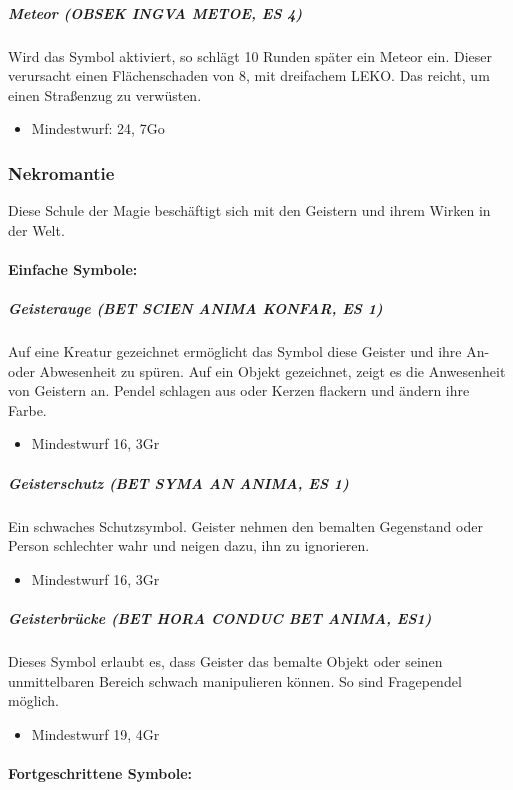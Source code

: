 \documentclass{article}
\begin{document}
\subparagraph{Meteor (OBSEK INGVA METOE, ES 4)}
Wird das Symbol aktiviert, so schlägt 10 Runden später ein Meteor ein. Dieser verursacht einen
Flächenschaden von 8, mit dreifachem LEKO. Das reicht, um einen Straßenzug zu verwüsten.
\begin{itemize}
\item Mindestwurf: 24, 7Go
\end{itemize}

\subsubsection{Nekromantie}

Diese Schule der Magie beschäftigt sich mit den Geistern und ihrem Wirken in der Welt.

\paragraph{Einfache Symbole:}

\subparagraph{Geisterauge (BET SCIEN ANIMA KONFAR, ES 1)}

Auf eine Kreatur gezeichnet ermöglicht das Symbol diese Geister und ihre An- oder Abwesenheit zu spüren. Auf ein
Objekt gezeichnet, zeigt es die Anwesenheit von Geistern an. Pendel schlagen aus oder Kerzen flackern und ändern
ihre Farbe.
\begin{itemize}
\item Mindestwurf 16, 3Gr
\end{itemize}

\subparagraph{Geisterschutz (BET SYMA AN ANIMA, ES 1) }

Ein schwaches Schutzsymbol. Geister nehmen den bemalten Gegenstand oder Person schlechter wahr und neigen dazu, ihn zu ignorieren.
\begin{itemize}
\item Mindestwurf 16, 3Gr
\end{itemize}

\subparagraph{Geisterbrücke (BET HORA CONDUC BET ANIMA, ES1)}

Dieses Symbol erlaubt es, dass Geister das bemalte Objekt oder seinen unmittelbaren Bereich schwach manipulieren können. So sind Fragependel möglich.
\begin{itemize}
\item Mindestwurf 19, 4Gr
\end{itemize}

\paragraph{Fortgeschrittene Symbole:}
\end{document}
